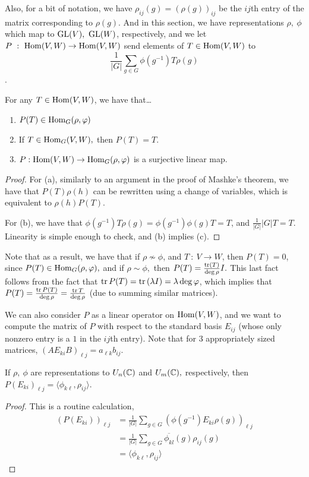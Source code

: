 \documentclass{article}
\begin{document}
Also, for a bit of notation, we have $\rho_{ij}(g) = (\rho(g))_{ij}$ be the $ij$th entry of the matrix corresponding to $\rho(g)$. And in this section, we have representations $\rho, \ \phi$ which map to $\operatorname{GL}(V), \ \operatorname{GL}(W)$, respectively, and we let $P \ : \ \operatorname{Hom}(V,W) \to \operatorname{Hom}(V,W)$ send elements of $T \in \operatorname{Hom}(V,W)$ to $$\frac{1}{|G|} \sum_{g \in G} \phi(g^{-1})T\rho(g)$$.

\begin{lemma}
For any $T \in \operatorname{Hom}(V,W)$, we have that\ldots
\begin{enumerate}[label=(\alph*)]
    \item $P(T) \in \operatorname{Hom}_G(\rho,\varphi)$
    \item If $T \in \operatorname{Hom}_G(V,W),$ then $P(T)=T$.
    \item $P : \operatorname{Hom}(V,W) \to \operatorname{Hom}_G(\rho,\varphi)$ is a surjective linear map.
\end{enumerate}
\end{lemma}

\begin{proof}

For (a), similarly to an argument in the proof of Mashke's theorem, we have that $P(T)\rho(h)$ can be rewritten using a change of variables, which is equivalent to $\rho(h)P(T).$

For (b), we have that $\phi(g^{-1})T\rho(g)=\phi(g^{-1})\phi(g)T=T$, and $\frac{1}{|G|} |G|T = T$. Linearity is simple enough to check, and (b) implies (c).

\end{proof}

Note that as a result, we have that if $\rho \not\sim \phi$, and $T \ : \ V \to W$, then $P(T) = 0$, since $P(T) \in \operatorname{Hom}_G(\rho,\varphi),$ and if $\rho \sim \phi,$ then $P(T) = \frac{\operatorname{tr} (T)}{\deg \rho} I.$ This last fact follows from the fact that $\operatorname{tr} P(T)= \operatorname{tr} \left( \lambda I \right) = \lambda \deg \varphi$, which implies that $P(T) = \frac{\operatorname{tr} P(T)}{\deg \rho} = \frac{\operatorname{tr} T}{\deg \rho}$ (due to summing similar matrices). 

We can also consider $P$ as a linear operator on $\operatorname{Hom}(V,W)$, and we want to compute the matrix of $P$ with respect to the standard basis $E_{ij}$ (whose only nonzero entry is a $1$ in the $ij$th entry). Note that for 3 appropriately sized matrices, $(AE_{ki}B)_{\ell j} = a_{\ell k}b_{ij}$.

\begin{lemma}

If $\rho, \ \phi$ are representations to $U_n(\mathbb C)$ and $U_m(\mathbb C),$ respectively, then $P(E_{ki})_{\ell j} = \langle \phi_{k\ell}, \rho_{ij} \rangle$.

\end{lemma}
\begin{proof}
This is a routine calculation,
\begin{align*}
    (P(E_{ki}))_{\ell j} &= \frac{1}{|G|} \sum_{g \in G} (\phi(g^{-1})E_{ki}\rho(g))_{\ell j} \\
    &= \frac{1}{|G|} \sum_{g \in G} \overline{\phi_{kl}}(g)\rho_{ij}(g) \\
    &= \langle \phi_{k\ell}, \rho_{ij}\rangle
\end{align*}
\end{proof}
\end{document}
